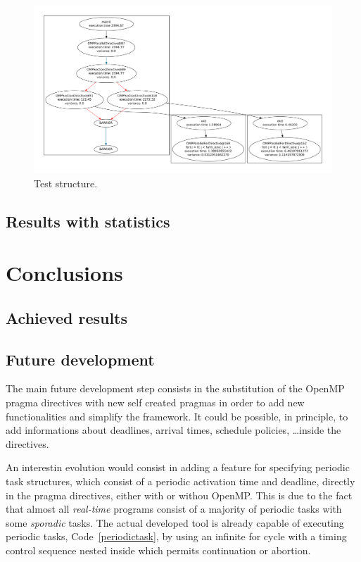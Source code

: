 \documentclass[a4paper,12pt,oneside]{book}
\begin{document}
\begin{figure}[H]
\centering
\includegraphics[scale=0.3]{functiongraphs.pdf}
\caption{Test structure.}
\label{teststructure}
\end{figure}

\section{Results with statistics}

\chapter{Conclusions}
\section{Achieved results}
\section{Future development}

The main future development step consists in the substitution of the OpenMP pragma directives with new self created pragmas in order to add new functionalities and simplify the framework. It could be possible, in principle, to add informations about deadlines, arrival times, schedule policies, \dots inside the directives. 

An interestin evolution would consist in adding a feature for specifying periodic task structures, which consist of a periodic activation time and deadline, directly in the pragma directives, either with or withou OpenMP. This is due to the fact that almost all \emph{real-time} programs consist of a majority of periodic tasks with some \emph{sporadic} tasks. The actual developed tool is already capable of executing periodic tasks, Code~\ref{periodictask}, by using an infinite for cycle with a timing control sequence nested inside which permits continuation or abortion.
\end{document}
